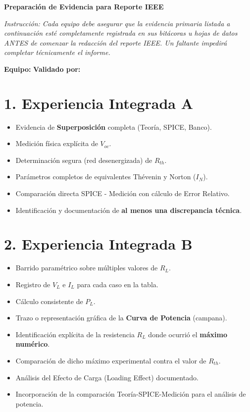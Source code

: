\documentclass[11pt, a4paper]{article}
\begin{document}
\begin{tcolorbox}[colback=ucbblue!5!white, colframe=ucbblue, title=\textbf{Checklist de Integración: Cierre Total de Laboratorio (A+B)}]
    \centering \textbf{Preparación de Evidencia para Reporte IEEE}
\end{tcolorbox}

\noindent \textit{Instrucción: Cada equipo debe asegurar que la evidencia primaria listada a continuación esté completamente registrada en sus bitácoras u hojas de datos ANTES de comenzar la redacción del reporte IEEE. Un faltante impedirá completar técnicamente el informe.}

\vspace{0.3cm}
\textbf{Equipo:} \hrulefill \quad \textbf{Validado por:} \hrulefill

\section*{1. Experiencia Integrada A}
\begin{itemize}\setlength\itemsep{0.1em}
    \item[$\square$] Evidencia de \textbf{Superposición} completa (Teoría, SPICE, Banco).
    \item[$\square$] Medición física explícita de $V_{oc}$.
    \item[$\square$] Determinación segura (red desenergizada) de $R_{th}$.
    \item[$\square$] Parámetros completos de equivalentes Thévenin y Norton ($I_N$).
    \item[$\square$] Comparación directa SPICE - Medición con cálculo de Error Relativo.
    \item[$\square$] Identificación y documentación de \textbf{al menos una discrepancia técnica}.
\end{itemize}

\section*{2. Experiencia Integrada B}
\begin{itemize}\setlength\itemsep{0.1em}
    \item[$\square$] Barrido paramétrico sobre múltiples valores de $R_L$.
    \item[$\square$] Registro de $V_L$ e $I_L$ para cada caso en la tabla.
    \item[$\square$] Cálculo consistente de $P_L$.
    \item[$\square$] Trazo o representación gráfica de la \textbf{Curva de Potencia} (campana).
    \item[$\square$] Identificación explícita de la resistencia $R_L$ donde ocurrió el \textbf{máximo numérico}.
    \item[$\square$] Comparación de dicho máximo experimental contra el valor de $R_{th}$.
    \item[$\square$] Análisis del Efecto de Carga (Loading Effect) documentado.
    \item[$\square$] Incorporación de la comparación Teoría-SPICE-Medición para el análisis de potencia.
\end{itemize}
\end{document}
